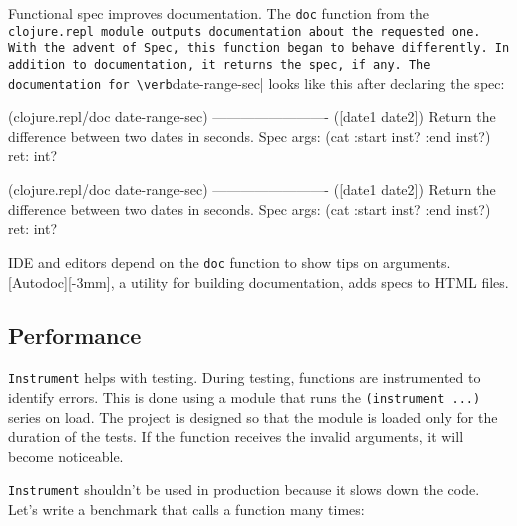 Functional spec improves documentation. The \verb|doc| function from the \verb|clojure.repl module outputs documentation about the requested one. With the advent of Spec, this function began to behave differently. In addition to documentation, it returns the spec, if any. The documentation for \verb|date-range-sec| looks like this after declaring the spec:

\ifx\DEVICETYPE\MOBILE

\begin{english}
  \begin{clojure}
(clojure.repl/doc date-range-sec)
-------------------------
([date1 date2])
  Return the difference
            between two dates in seconds.
Spec
  args: (cat :start inst? :end inst?)
  ret: int?
  \end{clojure}
\end{english}

\else

\begin{english}
  \begin{clojure}
(clojure.repl/doc date-range-sec)
-------------------------
([date1 date2])
  Return the difference between two dates in seconds.
Spec
  args: (cat :start inst? :end inst?)
  ret: int?
  \end{clojure}
\end{english}

\fi


IDE and editors depend on the \verb|doc| function to show tips on arguments. [Autodoc][-3mm], a utility for building documentation, adds specs to HTML files.

\subsection{Performance}


\verb|Instrument| helps with testing. During testing, functions are instrumented to identify errors. This is done using a module that runs the \verb|(instrument ...)| series on load. The project is designed so that the module is loaded only for the duration of the tests. If the function receives the invalid arguments, it will become noticeable.


\verb|Instrument| shouldn't be used in production because it slows down the code. Let's write a benchmark that calls a function many times:


